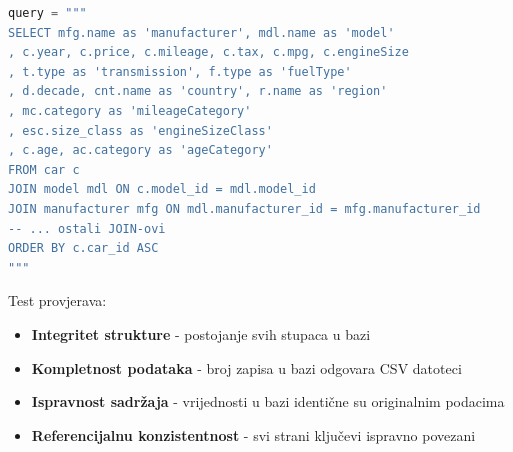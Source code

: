 \begin{lstlisting}[language=Python, caption={SQL upit za rekonstrukciju originalnih podataka}]
query = """
SELECT mfg.name as 'manufacturer', mdl.name as 'model'
, c.year, c.price, c.mileage, c.tax, c.mpg, c.engineSize
, t.type as 'transmission', f.type as 'fuelType'
, d.decade, cnt.name as 'country', r.name as 'region'
, mc.category as 'mileageCategory'
, esc.size_class as 'engineSizeClass'
, c.age, ac.category as 'ageCategory'
FROM car c
JOIN model mdl ON c.model_id = mdl.model_id
JOIN manufacturer mfg ON mdl.manufacturer_id = mfg.manufacturer_id
-- ... ostali JOIN-ovi
ORDER BY c.car_id ASC
"""
\end{lstlisting}

Test provjerava:
\begin{itemize}
    \item \textbf{Integritet strukture} - postojanje svih stupaca u bazi
    \item \textbf{Kompletnost podataka} - broj zapisa u bazi odgovara CSV datoteci
    \item \textbf{Ispravnost sadržaja} - vrijednosti u bazi identične su originalnim podacima
    \item \textbf{Referencijalnu konzistentnost} - svi strani ključevi ispravno povezani
\end{itemize}
